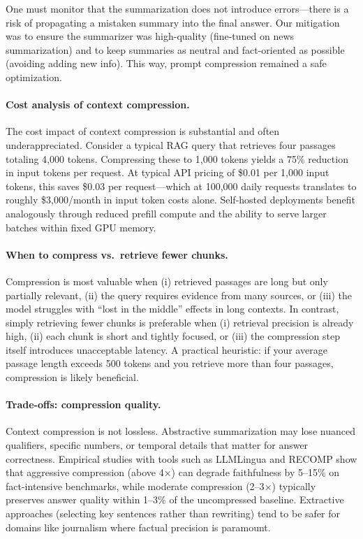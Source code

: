 One must monitor that the summarization does not introduce errors—there is a risk of propagating a mistaken summary into the final answer. Our mitigation was to ensure the summarizer was high-quality (fine-tuned on news summarization) and to keep summaries as neutral and fact-oriented as possible (avoiding adding new info). This way, prompt compression remained a safe optimization.

\paragraph{Cost analysis of context compression.}
The cost impact of context compression is substantial and often underappreciated. Consider a typical RAG query that retrieves four passages totaling 4{,}000 tokens. Compressing these to 1{,}000 tokens yields a 75\% reduction in input tokens per request. At typical API pricing of \$0.01 per 1{,}000 input tokens, this saves \$0.03 per request---which at 100{,}000 daily requests translates to roughly \$3{,}000/month in input token costs alone. Self-hosted deployments benefit analogously through reduced prefill compute and the ability to serve larger batches within fixed GPU memory.

\paragraph{When to compress vs.\ retrieve fewer chunks.}
Compression is most valuable when (i) retrieved passages are long but only partially relevant, (ii) the query requires evidence from many sources, or (iii) the model struggles with ``lost in the middle'' effects in long contexts. In contrast, simply retrieving fewer chunks is preferable when (i) retrieval precision is already high, (ii) each chunk is short and tightly focused, or (iii) the compression step itself introduces unacceptable latency. A practical heuristic: if your average passage length exceeds 500 tokens and you retrieve more than four passages, compression is likely beneficial.

\paragraph{Trade-offs: compression quality.}
Context compression is not lossless. Abstractive summarization may lose nuanced qualifiers, specific numbers, or temporal details that matter for answer correctness. Empirical studies with tools such as LLMLingua and RECOMP show that aggressive compression (above 4$\times$) can degrade faithfulness by 5--15\% on fact-intensive benchmarks, while moderate compression (2--3$\times$) typically preserves answer quality within 1--3\% of the uncompressed baseline. Extractive approaches (selecting key sentences rather than rewriting) tend to be safer for domains like journalism where factual precision is paramount.

